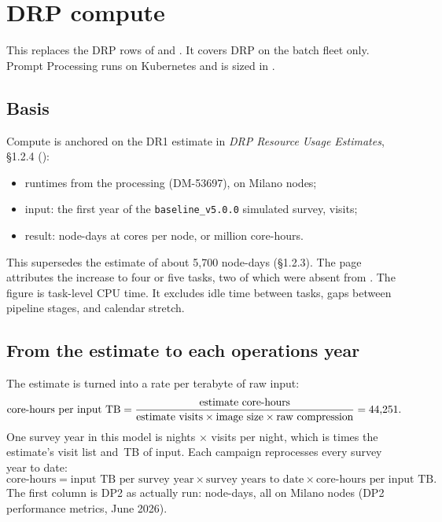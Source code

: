 \section{DRP compute}\label{sec:upcompute}

This replaces the DRP rows of  and
. It covers DRP on the batch fleet only. Prompt
Processing runs on Kubernetes and is sized in .

\subsection{Basis}

Compute is anchored on the DR1 estimate in \emph{DRP Resource Usage
Estimates}, \S1.2.4 ():
\begin{itemize}
\item runtimes from the \vthirty{} processing (DM-53697), on Milano
      nodes;
\item input: the first year of the \texttt{baseline\_v5.0.0} simulated
      survey, \smDRoneVisits{} visits;
\item result: \smDRoneNodeDays{} node-days at \smCoresNode{} cores per node,
      or \smDRoneCoreHoursM{} million core-hours.
\end{itemize}
This supersedes the \wfortyone{} estimate of about 5{,}700 node-days (\S1.2.3).
The page attributes the increase to four or five tasks, two of which were
absent from \wfortyone{}. The figure is task-level CPU time. It excludes idle
time between tasks, gaps between pipeline stages, and calendar stretch.

\subsection{From the estimate to each operations year}

The estimate is turned into a rate per terabyte of raw input:
\[
  \text{core-hours per input TB} =
  \frac{\text{estimate core-hours}}
       {\text{estimate visits} \times \text{image size} \times \text{raw compression}}
  = \mbox{44,251} .
\]
One survey year in this model is \smNights{} nights $\times$
\smVisits{} visits per night, which is \smYrScale{} times the estimate's visit
list and \smInputTB{}\,TB of input. Each campaign reprocesses every survey
year to date:
\[
  \text{core-hours} = \text{input TB per survey year} \times
  \text{survey years to date} \times \text{core-hours per input TB}.
\]
The first column is DP2 as actually run: \smDPtwoNodeDays{} node-days, all on
Milano nodes (DP2 performance metrics, June 2026).


